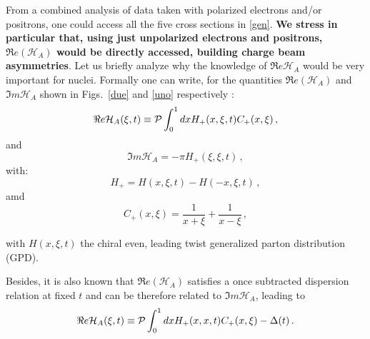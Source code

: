 \documentclass[times, twoside]{PosWhiPap}
\begin{document}
From a combined analysis of data taken with polarized electrons and/or 
positrons, one could access all the five cross sections in \eqref{gen}.
{\bf We stress in particular that, using just unpolarized electrons and positrons, $\Re 
e(\mathcal{H}_{A})$ would be directly accessed, building charge beam asymmetries}. Let us briefly 
analyze why the knowledge of $\Re e\mathcal{H}_{A}$ would be very
important for nuclei. Formally one can write,
for the quantities $\Re e(\mathcal{H}_{A})$ and $\Im m \mathcal{H}_{A}$
shown in Figs.~\ref{due} and \ref{uno} respectively \cite{Guidal:2013rya}:
\begin{equation}
\Re e \mathcal{H}_{A} (\xi,t) \equiv 
{\cal P} \int_0^1 dx H_+(x,\xi,t) C_+(x,\xi) \, ,
\label{ReC}
\end{equation}
and
\begin{equation}
  \Im m \mathcal{H}_{A} = -\pi H_+(\xi,\xi,t)  \, ,
\end{equation}
with:
\begin{equation}
    H_+ = H(x,\xi,t)-H(-x,\xi,t) \, ,
\end{equation}
amd
\begin{equation}
    C_+(x,\xi) = \frac{1}{x+\xi}+\frac{1}{x-\xi} \, ,
\end{equation}

with $H(x,\xi,t)$ the chiral even, leading twist generalized parton distribution
(GPD).


Besides, it is also known that $\Re e(\mathcal{H}_{A})$ satisfies a once 
subtracted dispersion relation at fixed $t$ and can be therefore related
to $\Im m \mathcal{H}_{A}$, leading to 
\cite{Anikin:2007yh,Diehl:2007jb,Radyushkin:2011dh,Pasquini:2014vua}
\begin{equation}
\Re e \mathcal{H}_{A} (\xi,t) \equiv
{\cal P} \int_0^1 dx H_+(x,x,t) C_+(x,\xi)
- \Delta(t) \, .
\label{disp}
\end{equation}
\end{document}
